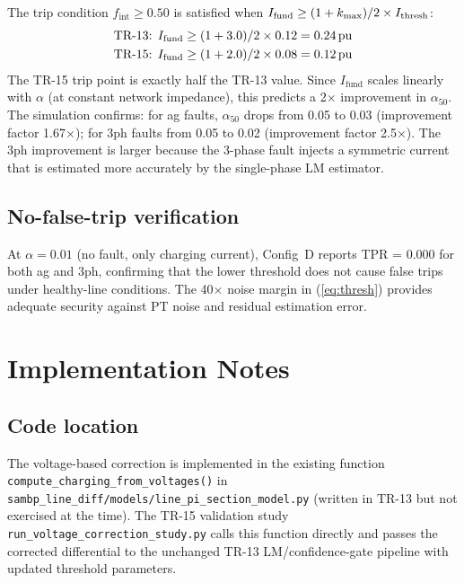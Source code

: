 \documentclass[11pt,a4paper]{article}
\newcommand{\Ifund}{I_{\mathrm{fund}}}
\newcommand{\fint}{f_{\mathrm{int}}}
\newcommand{\alphafifty}{\alpha_{50}}
\newcommand{\pu}{\,\text{pu}}
\begin{document}
The trip condition $\fint \geq 0.50$ is satisfied when
$I_{\rm fund} \geq (1 + k_{\rm max})/2 \times I_{\rm thresh}$:
\begin{align*}
  \text{TR-13: } I_{\rm fund} &\geq (1+3.0)/2 \times 0.12 = 0.24\pu\\
  \text{TR-15: } I_{\rm fund} &\geq (1+2.0)/2 \times 0.08 = 0.12\pu
\end{align*}
The TR-15 trip point is exactly half the TR-13 value.  Since $\Ifund$ scales
linearly with $\alpha$ (at constant network impedance), this predicts a 2$\times$
improvement in $\alphafifty$.  The simulation confirms: for ag faults,
$\alphafifty$ drops from 0.05 to 0.03 (improvement factor 1.67$\times$); for
3ph faults from 0.05 to 0.02 (improvement factor 2.5$\times$).  The 3ph
improvement is larger because the 3-phase fault injects a symmetric current
that is estimated more accurately by the single-phase LM estimator.

\subsection{No-false-trip verification}

At $\alpha = 0.01$ (no fault, only charging current), Config~D reports
TPR = 0.000 for both ag and 3ph, confirming that the lower threshold does
not cause false trips under healthy-line conditions.  The 40$\times$ noise
margin in (\ref{eq:thresh}) provides adequate security against PT noise
and residual estimation error.

\section{Implementation Notes}
\label{sec:implementation}

\subsection{Code location}

The voltage-based correction is implemented in the existing function
\texttt{compute\_charging\_from\_voltages()} in
\texttt{sambp\_line\_diff/models/line\_pi\_section\_model.py} (written in
TR-13 but not exercised at the time).  The TR-15 validation study
\texttt{run\_voltage\_correction\_study.py} calls this function directly and
passes the corrected differential to the unchanged TR-13 LM/confidence-gate
pipeline with updated threshold parameters.
\end{document}
